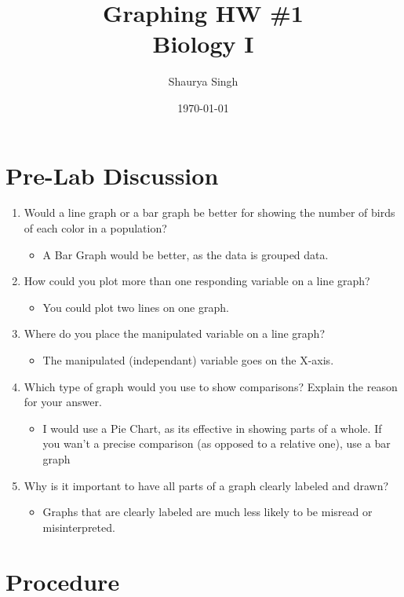 \documentclass{scrartcl}
\author{Shaurya Singh}
\date{\today}
\title{Graphing HW \#1\\\medskip
\large Biology I}
\begin{document}
\maketitle
\setcounter{tocdepth}{2}
\tableofcontents


\section{Pre-Lab Discussion}
\label{sec:orgf5d7f80}
\begin{enumerate}
\item Would a line graph or a bar graph be better for showing the number of birds
of each color in a population?
\begin{itemize}
\item A Bar Graph would be better, as the data is grouped data.
\end{itemize}
\item How could you plot more than one responding variable on a line graph?
\begin{itemize}
\item You could plot two lines on one graph.
\end{itemize}
\item Where do you place the manipulated variable on a line graph?
\begin{itemize}
\item The manipulated (independant) variable goes on the X-axis.
\end{itemize}
\item Which type of graph would you use to show comparisons? Explain the reason for your answer.
\begin{itemize}
\item I would use a Pie Chart, as its effective in showing parts of a whole. If
you wan't a precise comparison (as opposed to a relative one), use a bar graph
\end{itemize}
\item Why is it important to have all parts of a graph clearly labeled and drawn?
\begin{itemize}
\item Graphs that are clearly labeled are much less likely to be misread or misinterpreted.
\end{itemize}
\end{enumerate}

\section{Procedure}
\label{sec:org65f2263}
\end{document}
